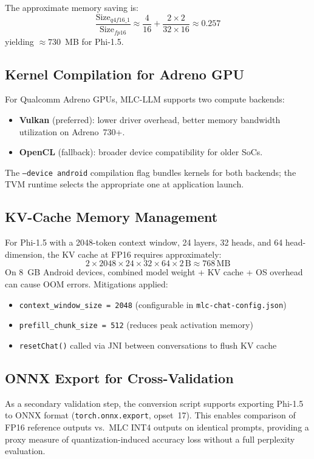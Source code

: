 \documentclass[12pt,letterpaper]{article}
\begin{document}
The approximate memory saving is:
\[
    \frac{\text{Size}_{q4f16\_1}}{\text{Size}_{fp16}}
    \approx \frac{4}{16} + \frac{2 \times 2}{32 \times 16}
    \approx 0.257
\]
yielding $\approx 730$~MB for Phi-1.5.

\subsection{Kernel Compilation for Adreno GPU}

For Qualcomm Adreno GPUs, MLC-LLM supports two compute backends:
\begin{itemize}[noitemsep]
    \item \textbf{Vulkan} (preferred): lower driver overhead, better memory
          bandwidth utilization on Adreno~730+.
    \item \textbf{OpenCL} (fallback): broader device compatibility for older SoCs.
\end{itemize}
The \texttt{--device android} compilation flag bundles kernels for both backends;
the TVM runtime selects the appropriate one at application launch.

\subsection{KV-Cache Memory Management}

For Phi-1.5 with a 2048-token context window, 24 layers, 32 heads, and 64
head-dimension, the KV cache at FP16 requires approximately:
\[
    2 \times 2048 \times 24 \times 32 \times 64 \times 2\,\text{B}
    \approx 768\,\text{MB}
\]
On 8~GB Android devices, combined model weight + KV cache + OS overhead can
cause OOM errors. Mitigations applied:
\begin{itemize}[noitemsep]
    \item \texttt{context\_window\_size = 2048} (configurable in \texttt{mlc-chat-config.json})
    \item \texttt{prefill\_chunk\_size = 512} (reduces peak activation memory)
    \item \texttt{resetChat()} called via JNI between conversations to flush KV cache
\end{itemize}

\subsection{ONNX Export for Cross-Validation}

As a secondary validation step, the conversion script supports exporting Phi-1.5
to ONNX format (\texttt{torch.onnx.export}, opset~17).
This enables comparison of FP16 reference outputs vs.\ MLC INT4 outputs
on identical prompts, providing a proxy measure of quantization-induced
accuracy loss without a full perplexity evaluation.
\end{document}
